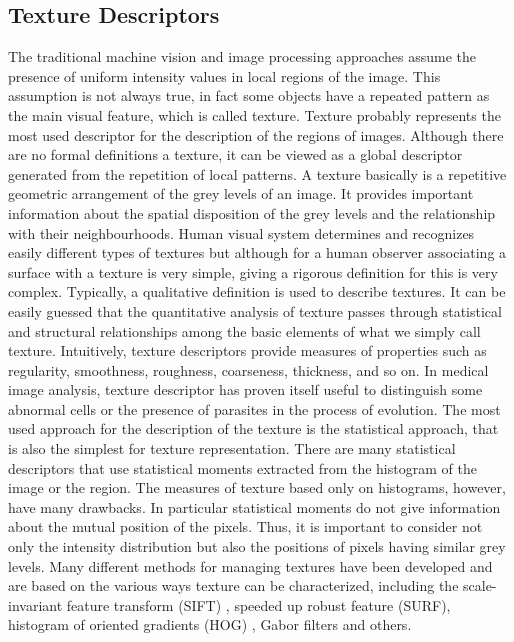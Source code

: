 \documentclass[final,a4paper,12pt,english]{UnicaPhdThesis3}
\begin{document}
	\subsection{Texture Descriptors} %
	The traditional machine vision and image processing approaches assume the presence of uniform intensity values in local regions of the image. This assumption is not always true, in fact some objects have a repeated pattern as the main visual feature, which is called texture. Texture probably represents the most used descriptor for the description of the regions of images. Although there are no formal definitions a texture, it can be viewed as a global descriptor generated from the repetition of local patterns. A texture basically is a repetitive geometric arrangement of the grey levels of an image. It provides important information about the spatial disposition of the grey levels and the relationship with their neighbourhoods. Human visual system determines and recognizes easily different types of textures but although for a human observer associating a surface with a texture is very simple, giving a rigorous definition for this is very complex. Typically, a qualitative definition is used to describe textures. It can be easily guessed that the quantitative analysis of texture passes through statistical and structural relationships among the basic elements of what we simply call texture. Intuitively, texture descriptors provide measures of properties such as regularity, smoothness, roughness, coarseness, thickness, and so on. In medical image analysis, texture descriptor has proven itself useful to distinguish some abnormal cells or the presence of parasites in the process of evolution. The most used approach for the description of the texture is the statistical approach, that is also the simplest for texture representation. There are many statistical descriptors that use statistical moments extracted from the histogram of the image or the region. The measures of texture based only on histograms, however, have many drawbacks. In particular statistical moments do not give information about the mutual position of the pixels. Thus, it is important to consider not only the intensity distribution but also the positions of pixels having similar grey levels. Many different methods for managing textures have been developed and are based on the various ways texture can be characterized, including the scale-invariant feature transform (SIFT) \cite{Lowe}, speeded up robust feature (SURF)\cite{Bay}, histogram of oriented gradients (HOG) \cite{Dalal}, Gabor filters \cite{Jain} and others.
	
\end{document}
